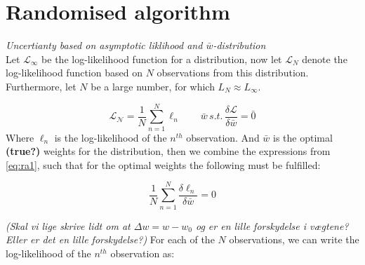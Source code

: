 \section{Randomised algorithm}
\emph{Uncertianty based on asymptotic liklihood and $\bar{w}$-distribution}\\
Let $\mathcal{L}_\infty$ be the log-likelihood function for a distribution, now let $\mathcal{L}_N$ denote the log-likelihood function based on $N$ observations from this distribution. Furthermore, let $N$ be a large number, for which $L_N \approx L_\infty$. 

\begin{equation}
\mathcal{L_N} = \frac{1}{N} \sum_{n=1}^N \ell_n \qquad \bar{w} \, s.t. \, \frac{\delta \mathcal{L}}{\delta \bar{w}} = \bar{0} \label{eq:ra1}
\end{equation}
Where $\ell_n$ is the log-likelihood of the $n^{th}$ observation. And $\bar{w}$ is the optimal \textbf{(true?)} weights for the distribution, then we combine the expressions from \eqref{eq:ra1}, such that for the optimal weights the following must be fulfilled:

\begin{equation}
\frac{1}{N} \sum_{n = 1}^N \frac{\delta \ell_n}{\delta \bar{w}} = 0 \label{eq:ra2}
\end{equation}

\emph{(Skal vi lige skrive lidt om at $\Delta w = w-w_0$ og er en lille forskydelse i vægtene? Eller er det en lille forskydelse?) }
For each of the $N$ observations, we can write the log-likelihood of the $n^{th}$ observation as:

